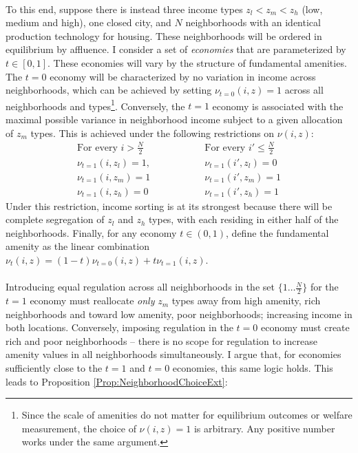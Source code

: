 \documentclass[11pt]{article}
\begin{document}
	\paragraph*{}
	To this end, suppose there is instead three income types $z_{l} < z_{m} < z_{h}$ (low, medium and high), one closed city, and $N$ neighborhoods with an identical production technology for housing. These neighborhoods will be ordered in equilibrium by affluence. I consider a set of \textit{economies} that are parameterized by $t \in [0, 1]$. These economies will vary by the structure of fundamental amenities. The $t = 0$ economy will be characterized by no variation in income across neighborhoods, which can be achieved by setting $\nu_{t = 0}(i, z) = 1$ across all neighborhoods and types\footnote{Since the scale of amenities do not matter for equilibrium outcomes or welfare measurement, the choice of $\nu(i, z) = 1$ is arbitrary. Any positive number works under the same argument.}. Conversely, the $t = 1$ economy is associated with the maximal possible variance in neighborhood income subject to a given allocation of $z_{m}$ types. This is achieved under the following restrictions on $\nu(i, z)$:
	\begin{eqnarray*}
		\text{For every $i > \frac{N}{2}$} &\quad \quad \quad \quad & \text{For every $i' \leq \frac{N}{2}$} \\
		\nu_{t = 1}(i, z_{l})  = 1, & & \nu_{t = 1}(i', z_{l}) = 0 \\
		\nu_{t = 1}(i, z_{m})  = 1  & &\nu_{t = 1}(i', z_{m})  = 1 \\ 
		\nu_{t = 1}(i, z_{h})  = 0  & &\nu_{t = 1}(i', z_{h})  = 1
	\end{eqnarray*}
	Under this restriction, income sorting is at its strongest because there will be complete segregation of $z_{l}$ and $z_{h}$ types, with each residing in either half of the neighborhoods. Finally, for any economy $t \in (0, 1)$, define the fundamental amenity as the linear combination $\nu_{t}(i, z) = (1-t)\nu_{t = 0}(i, z) + t\nu_{t = 1}(i, z)$. 
	
	\paragraph*{} 
	Introducing equal regulation across all neighborhoods in the set $\{1 \dots \frac{N}{2}\}$ for the $t = 1$ economy must reallocate \textit{only} $z_{m}$ types away from high amenity, rich neighborhoods and toward low amenity, poor neighborhoods; increasing income in both locations. Conversely, imposing regulation in the $t = 0$ economy must create rich and poor neighborhoods -- there is no scope for regulation to increase amenity values in all neighborhoods simultaneously. I argue that, for economies sufficiently close to the $t = 1$ and $t = 0$ economies, this same logic holds. This leads to Proposition \ref{Prop:NeighborhoodChoiceExt}: 
\end{document}
